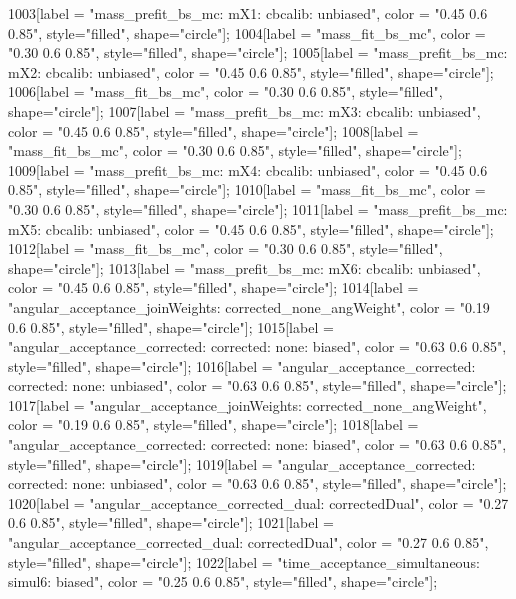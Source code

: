 {	1003[label = "mass_prefit_bs_mc\nmassbin: mX1\nmassmodel: cbcalib\ntrigger: unbiased", color = "0.45 0.6 0.85", style="filled", shape="circle"];
	1004[label = "mass_fit_bs_mc", color = "0.30 0.6 0.85", style="filled", shape="circle"];
	1005[label = "mass_prefit_bs_mc\nmassbin: mX2\nmassmodel: cbcalib\ntrigger: unbiased", color = "0.45 0.6 0.85", style="filled", shape="circle"];
	1006[label = "mass_fit_bs_mc", color = "0.30 0.6 0.85", style="filled", shape="circle"];
	1007[label = "mass_prefit_bs_mc\nmassbin: mX3\nmassmodel: cbcalib\ntrigger: unbiased", color = "0.45 0.6 0.85", style="filled", shape="circle"];
	1008[label = "mass_fit_bs_mc", color = "0.30 0.6 0.85", style="filled", shape="circle"];
	1009[label = "mass_prefit_bs_mc\nmassbin: mX4\nmassmodel: cbcalib\ntrigger: unbiased", color = "0.45 0.6 0.85", style="filled", shape="circle"];
	1010[label = "mass_fit_bs_mc", color = "0.30 0.6 0.85", style="filled", shape="circle"];
	1011[label = "mass_prefit_bs_mc\nmassbin: mX5\nmassmodel: cbcalib\ntrigger: unbiased", color = "0.45 0.6 0.85", style="filled", shape="circle"];
	1012[label = "mass_fit_bs_mc", color = "0.30 0.6 0.85", style="filled", shape="circle"];
	1013[label = "mass_prefit_bs_mc\nmassbin: mX6\nmassmodel: cbcalib\ntrigger: unbiased", color = "0.45 0.6 0.85", style="filled", shape="circle"];
	1014[label = "angular_acceptance_joinWeights\nwflag: corrected_none_angWeight", color = "0.19 0.6 0.85", style="filled", shape="circle"];
	1015[label = "angular_acceptance_corrected\nangacc: corrected\ncsp: none\ntrigger: biased", color = "0.63 0.6 0.85", style="filled", shape="circle"];
	1016[label = "angular_acceptance_corrected\nangacc: corrected\ncsp: none\ntrigger: unbiased", color = "0.63 0.6 0.85", style="filled", shape="circle"];
	1017[label = "angular_acceptance_joinWeights\nwflag: corrected_none_angWeight", color = "0.19 0.6 0.85", style="filled", shape="circle"];
	1018[label = "angular_acceptance_corrected\nangacc: corrected\ncsp: none\ntrigger: biased", color = "0.63 0.6 0.85", style="filled", shape="circle"];
	1019[label = "angular_acceptance_corrected\nangacc: corrected\ncsp: none\ntrigger: unbiased", color = "0.63 0.6 0.85", style="filled", shape="circle"];
	1020[label = "angular_acceptance_corrected_dual\nstep: correctedDual", color = "0.27 0.6 0.85", style="filled", shape="circle"];
	1021[label = "angular_acceptance_corrected_dual\nstep: correctedDual", color = "0.27 0.6 0.85", style="filled", shape="circle"];
	1022[label = "time_acceptance_simultaneous\ntimeacc: simul6\ntrigger: biased", color = "0.25 0.6 0.85", style="filled", shape="circle"];
}
